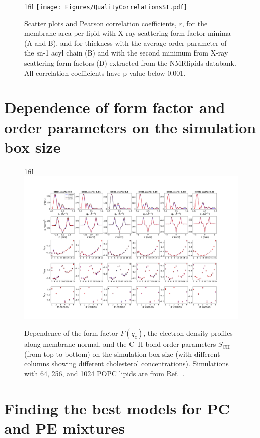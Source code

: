 \documentclass[fleqn,10pt]{wlscirepSI}
\makeatletter
\newcommand*{\centerfloat}{%
  \parindent \z@
  \leftskip \z@ \@plus 1fil \@minus \textwidth
  \rightskip\leftskip
  \parfillskip \z@skip}
\makeatother
\begin{document}
\begin{figure}[!h]
    \centerfloat
    \texttt{[image: Figures/QualityCorrelationsSI.pdf]}
    \caption{Scatter plots and Pearson correlation coefficients, $r$, for the membrane area per lipid with X-ray scattering form factor minima (A and B), and for thickness with the average order parameter of the {\textit sn}-1 acyl chain (B) and with the second minimum from X-ray scattering form factors (D) extracted from the NMRlipids databank. All correlation coefficients have p-value below 0.001.}
    \label{fig:QualityCorrelationsSI}
\end{figure}


\pagebreak
\section{Dependence of form factor and order parameters on the simulation box size}

\begin{figure}[!h]
    \centerfloat
    \includegraphics[width = 240mm]{Figures/SizeDependence.pdf}
    \caption{Dependence of the form factor $F(q_z)$, the electron density profiles along membrane normal, and the C--H bond order parameters $S_\mathrm{CH}$ (from top to bottom) on the simulation box size (with different columns showing different cholesterol concentrations). Simulations with 64, 256, and 1024 POPC lipids are from Ref.~. }
    \label{fig:sizedependence}
\end{figure}


\pagebreak
\section{Finding the best models for PC and PE mixtures}
\end{document}
